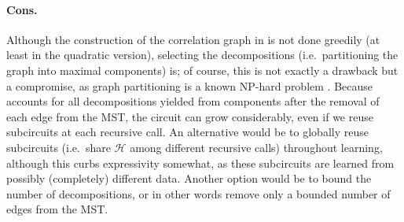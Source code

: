 \paragraph{Cons.} Although the construction of the correlation graph in  is
not done greedily (at least in the quadratic version), selecting the decompositions (i.e.\
partitioning the graph into maximal components) is; of course, this is not exactly a drawback but a
compromise, as graph partitioning is a known NP-hard problem \citep{feldmann15}. Because
\textproc{Prometheus} accounts for all decompositions yielded from components after the removal of
each edge from the MST, the circuit can grow considerably, even if we reuse subcircuits at each
recursive call. An alternative would be to globally reuse subcircuits (i.e.\ share $\mathcal{H}$
among different recursive calls) throughout learning, although this curbs expressivity somewhat, as
these subcircuits are learned from possibly (completely) different data. Another option would be to
bound the number of decompositions, or in other words remove only a bounded number of edges from
the MST.

